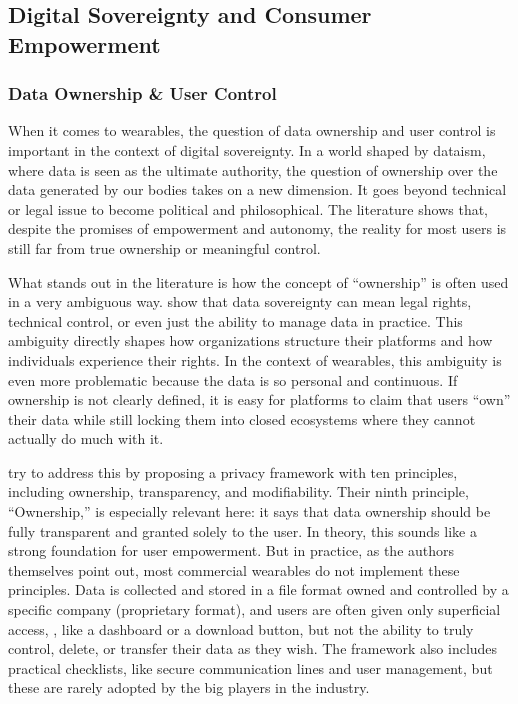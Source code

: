 \subsection{Digital Sovereignty and Consumer Empowerment}
	\subsubsection{Data Ownership \& User Control}

	When it comes to wearables, the question of data ownership and user control is important in the context of digital sovereignty. In a world shaped by dataism, where data is seen as the ultimate authority, the question of ownership over the data generated by our bodies takes on a new dimension. It goes beyond technical or legal issue to become political and philosophical. The literature shows that, despite the promises of empowerment and autonomy, the reality for most users is still far from true ownership or meaningful control.

	What stands out in the literature is how the concept of “ownership” is often used in a very ambiguous way. \cite{Hummel2021} show that data sovereignty can mean legal rights, technical control, or even just the ability to manage data in practice. This ambiguity directly shapes how organizations structure their platforms and how individuals experience their rights. In the context of wearables, this ambiguity is even more problematic because the data is so personal and continuous. If ownership is not clearly defined, it is easy for platforms to claim that users “own” their data while still locking them into closed ecosystems where they cannot actually do much with it.

	\cite{Safavi2014} try to address this by proposing a privacy framework with ten principles, including ownership, transparency, and modifiability. Their ninth principle, “Ownership,” is especially relevant here: it says that data ownership should be fully transparent and granted solely to the user. In theory, this sounds like a strong foundation for user empowerment. But in practice, as the authors themselves point out, most commercial wearables do not implement these principles. Data is collected and stored in a file format owned and controlled by a specific company (proprietary format), and users are often given only superficial access, \cite{Canali2022}, like a dashboard or a download button, but not the ability to truly control, delete, or transfer their data as they wish. The framework also includes practical checklists, like secure communication lines and user management, but these are rarely adopted by the big players in the industry.

